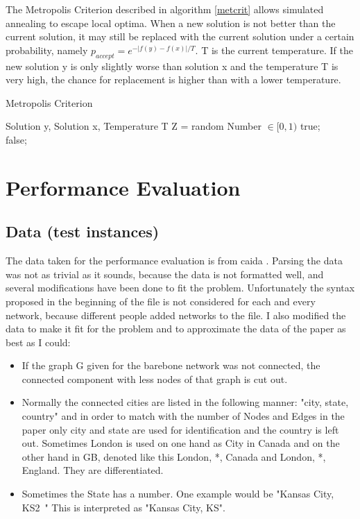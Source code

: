 \documentclass [12pt]{article}
\begin{document}
The Metropolis Criterion described in algorithm \ref{metcrit} allows simulated annealing to escape local optima. When a new solution is not better 
than the current solution, it may still be replaced with the current solution under a certain probability,
namely $p_{accept}=e^{-|f(y)-f(x)|/T}$. T is the current temperature. If the new solution y is only slightly worse than solution x and the temperature T is very high,
the chance for replacement is higher than with a lower temperature.

\begin {algorithm} [H]
\caption {Metropolis Criterion}
\label {metcrit}
\begin {algorithmic} [3]
\Require Solution y, Solution x, Temperature T
\State Z = random Number $\in [0,1)$
  \Return true;
  \EndIf\\
  \Return false;
  \end {algorithmic}
  \end {algorithm}

  \section{Performance Evaluation}

  \subsection{Data (test instances)}
  The data taken for the performance evaluation is from caida \cite{caidabarebones}. Parsing the
  data was not as trivial as it sounds, because the data is not formatted well,
  and several modifications have been done to fit the problem.
  Unfortunately the syntax proposed in the beginning of the file is not considered
  for each and every network, because different people added networks to the file.
  I also modified the data to make it fit for the problem and to approximate the
  data of the paper \cite{mirrorserver} as best as I could:
  \begin{itemize}
    \item If the graph G given for the barebone network was not connected,
      the connected component with less nodes of that graph is cut out.
    \item Normally the connected cities are listed in the following manner:
      "city, state, country" and in order to match with the number of Nodes and Edges
      in the paper \cite{mirrorserver} only city and state are used for
      identification and the country is left out. Sometimes London
      is used on one hand as City in Canada and on the other hand in GB, denoted like this
      London, *, Canada and London, *, England. They are differentiated.
    \item Sometimes the State has a number. One example would be "Kansas City, KS2~"
      This is interpreted as "Kansas City, KS".
  \end{itemize}
\end{document}
